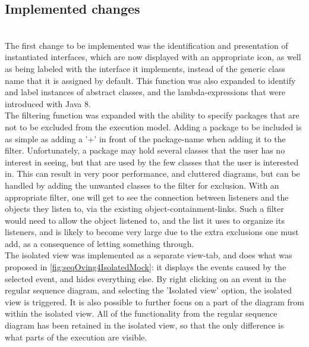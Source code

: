 \subsection{Implemented changes}\label{jiveImpl}%
~\\

The first change to be implemented was the identification and presentation of instantiated interfaces, which are now displayed with an appropriate icon, as well as being labeled with the interface it implements, instead of the generic class name that it is assigned by default.
This function was also expanded to identify and label instances of abstract classes, and the lambda-expressions that were introduced with Java 8.%
~\\

The filtering function was expanded with the ability to specify packages that are not to be excluded from the execution model.
Adding a package to be included is as simple as adding a '+' in front of the package-name when adding it to the filter.
Unfortunately, a package may hold several classes that the user has no interest in seeing, but that are used by the few classes that the user is interested in.
This can result in very poor performance, and cluttered diagrams, but can be handled by adding the unwanted classes to the filter for exclusion.
With an appropriate filter, one will get to see the connection between listeners and the objects they listen to, via the existing object-containment-links.
Such a filter would need to allow the object listened to, and the list it uses to organize its listeners, and is likely to become very large due to the extra exclusions one must add, as a consequence of letting something through. 
~\\

The isolated view was implemented as a separate view-tab, and does what was proposed in \autoref{fig:seqOving4IsolatedMock}: it displays the events caused by the selected event, and hides everything else.
By right clicking on an event in the regular sequence diagram, and selecting the 'Isolated view' option, the isolated view is triggered.
It is also possible to further focus on a part of the diagram from within the isolated view.
All of the functionality from the regular sequence diagram has been retained in the isolated view, so that the only difference is what parts of the execution are visible.
~\\
 
